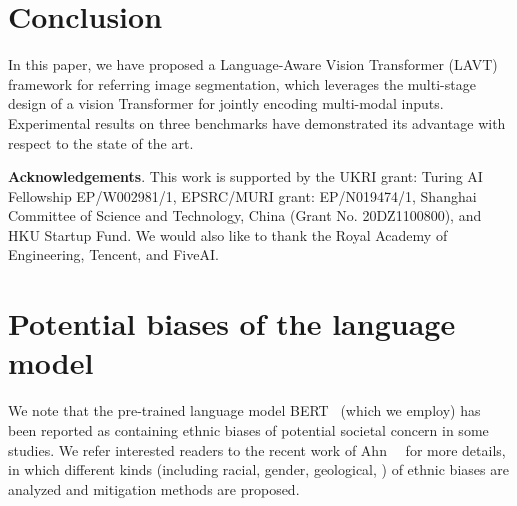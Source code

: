 \documentclass[10pt,twocolumn,letterpaper]{article}
\begin{document}
\begin{table}[t]
   \centering
   \caption{Comparison between our method, LTS~\cite{Jing_2021_Locate}, VLT~\cite{Ding_2021_vlt}, and EFN~\cite{EFN} on the RefCOCO validation set, where all models use the same backbone, language model, and training recipes.}
   \vspace{-0.2cm}
   \label{tab:4}
\end{table}
 \section{Conclusion}
\label{sec:conclusion}
In this paper, we have proposed a Language-Aware Vision Transformer (LAVT) framework for referring image segmentation, which leverages the multi-stage design of a vision Transformer for jointly encoding multi-modal inputs.
Experimental results on three benchmarks have demonstrated its advantage with respect to the state of the art.

\vspace{1ex}\noindent\textbf{Acknowledgements}.
This work is supported by the UKRI grant: Turing AI Fellowship EP/W002981/1, EPSRC/MURI grant: EP/N019474/1, Shanghai Committee of Science and Technology, China (Grant No. 20DZ1100800), and HKU Startup Fund.
We would also like to thank the Royal Academy of Engineering, Tencent, and FiveAI.


\clearpage
{\small


} \appendix

\section{Potential biases of the language model} \label{sec:lm}
We note that the pre-trained language model BERT~\cite{bert} (which we employ) has been reported as containing ethnic biases of potential societal concern in some studies.
We refer interested readers to the recent work of Ahn~\etal~\cite{ahn2021mitigating} for more details, in which different kinds (including racial, gender, geological, \etc) of ethnic biases are analyzed and mitigation methods are proposed.
\end{document}
